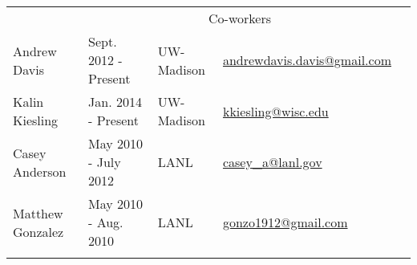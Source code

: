 \begin{longtable}{lllll}
               
				                   

              & \multicolumn{3}{c}{\Large{Co-workers}} &  \\  \vspace{2mm}

	      {Andrew Davis}\label{andy} & {Sept. 2012 - Present} &
	      {UW-Madison} &
	      \href{mailto:andrewdavis.davis@gmail.com}{andrewdavis.davis@gmail.com} \\
	      \vspace{2mm}
{Kalin Kiesling}\label{kk} & {Jan. 2014 - Present} & {UW-Madison}  &
	\href{mailto:kkiesling@wisc.edu}{kkiesling@wisc.edu} \\ \vspace{2mm}  %

{Casey Anderson}\label{cas} & {May 2010 - July 2012} & {LANL}&
\href{mailto:casey\_a@lanl.com}{casey\_a@lanl.gov} \\ \vspace{2mm}%

{Matthew Gonzalez}\label{matt_gonzo} & {May 2010 - Aug. 2010} & {LANL} &
	\href{mailto:gonzo1912@gmail.com}{gonzo1912@gmail.com} \\ \vspace{2mm}%
     


\vspace{-12mm} %
\end{longtable}






%
